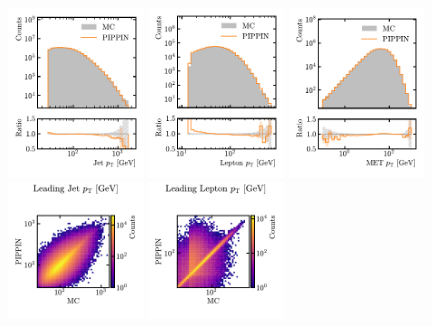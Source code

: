 \begin{figure}[htb]
    \centering
    \includegraphics[width=0.32\textwidth]{Figures/jet_generation/pippin/marginals/marginal_jet_pt.pdf}
    \includegraphics[width=0.32\textwidth]{Figures/jet_generation/pippin/marginals/marginal_lep_pt.pdf}
    \includegraphics[width=0.32\textwidth]{Figures/jet_generation/pippin/marginals/marginal_met_pt.pdf}
    \includegraphics[clip, trim=0cm 0cm 0cm 2.5cm, width=0.32\textwidth]{Figures/jet_generation/pippin/marginals_2D/marginal2D_jet_pt.pdf}
    \includegraphics[clip, trim=0cm 0cm 0cm 2.5cm, width=0.32\textwidth]{Figures/jet_generation/pippin/marginals_2D/marginal2D_lep_pt.pdf}

\end{figure}
